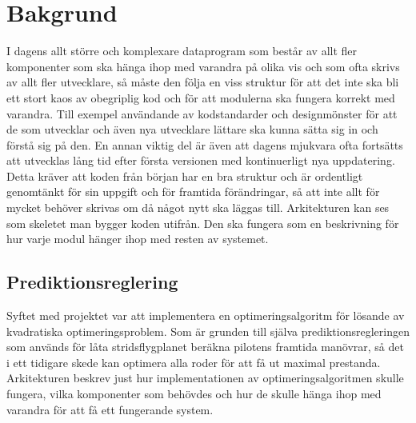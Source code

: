 \section{Bakgrund}
I dagens allt större och komplexare dataprogram som består av allt fler komponenter som ska hänga ihop med varandra på olika vis och som ofta skrivs av allt fler utvecklare, så måste den följa en viss struktur för att det inte ska bli ett stort kaos av obegriplig kod och för att modulerna ska fungera korrekt med varandra. Till exempel användande av kodstandarder och designmönster för att de som utvecklar och även nya utvecklare lättare ska kunna sätta sig in och förstå sig på den.
\newline
\newline
En annan viktig del är även att dagens mjukvara ofta fortsätts att utvecklas lång tid efter första versionen med kontinuerligt nya uppdatering. Detta kräver att koden från början har en bra struktur och är ordentligt genomtänkt för sin uppgift och för framtida förändringar, så att inte allt för mycket behöver skrivas om då något nytt ska läggas till.
\newline
\newline
Arkitekturen kan ses som skeletet man bygger koden utifrån. Den ska fungera som en beskrivning för hur varje modul hänger ihop med resten av systemet.

\subsection{Prediktionsreglering}
Syftet med projektet var att implementera en optimeringsalgoritm för lösande av kvadratiska optimeringsproblem. Som är grunden till själva prediktionsregleringen som används för låta stridsflygplanet beräkna pilotens framtida manövrar, så det i ett tidigare skede kan optimera alla roder för att få ut maximal prestanda.
\newline
\newline
Arkitekturen beskrev just hur implementationen av optimeringsalgoritmen skulle fungera, vilka komponenter som behövdes och hur de skulle hänga ihop med varandra för att få ett fungerande system.

